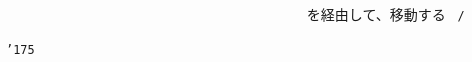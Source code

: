 \documentclass[a4paper,10pt]{article}
\def\mc{\relax}
\begin{document}
\noindent
\mbox{}{\tt\mc \ }{\tt\mc \ }{\tt\mc \ }{\tt\mc \ }{\tt\mc \ }{\tt\mc \ }{\tt\mc \ }{\tt\mc \ }{\tt\mc \ }{\tt\mc \ }{\tt\mc \ }{\tt\mc \ }{\tt\mc \ }{\tt\mc \ }{\tt\mc \ }{\tt\mc \ }{\tt\mc \ }{\tt\mc \ }{\tt\mc \ }{\tt\mc \ }{\tt\mc \ }{\tt\mc \ }{\tt\mc \ }{\tt\mc \ }{\tt\mc \ }{\tt\mc \ }{\tt\mc \ }{\tt\mc \ }{\tt\mc \ }{\tt\mc \ }{\tt\mc \ }{\tt\mc \ }{\tt\mc \ }{\tt\mc \ }{\tt\mc \ }{\tt\mc \ }{\tt\mc \ }{\tt\mc \ }{\tt\mc \ }{\tt\mc \ }\rm\mc {\tt /}{\tt *}\  \ を経由して、移動する \hfill \rm\mc \ {\tt *}{\tt /}
\tt\mc 

\noindent
\mbox{}{\tt\char'175}

\rm\mc
\end{document}
